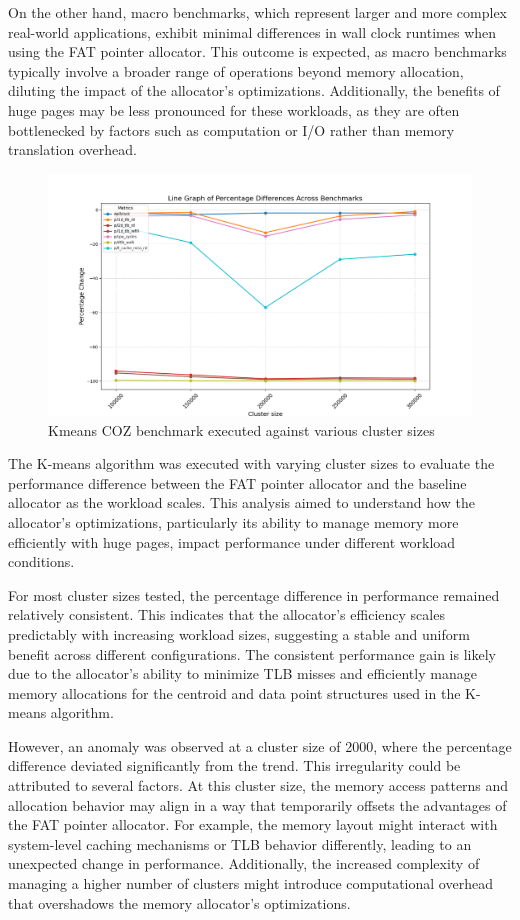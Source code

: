 \documentclass[11pt]{article}
\begin{document}
On the other hand, macro benchmarks, which represent larger and more complex real-world applications, 
exhibit minimal differences in wall clock runtimes when using the FAT pointer allocator. 
This outcome is expected, as macro benchmarks typically involve a broader range of operations 
beyond memory allocation, diluting the impact of the allocator's optimizations. Additionally, 
the benefits of huge pages may be less pronounced for these workloads, as they are often 
bottlenecked by factors such as computation or I/O rather than memory translation overhead.

\begin{figure}[htbp]
\centering
\includegraphics[width=.9\linewidth]{./diagrams/kmeans.png}
\caption{\label{fig:org5dab5a3}Kmeans COZ benchmark executed against various cluster sizes}
\end{figure}

The K-means algorithm was executed with varying cluster sizes to evaluate the performance difference 
between the FAT pointer allocator and the baseline allocator as the workload scales. This analysis 
aimed to understand how the allocator's optimizations, particularly its ability to manage memory 
more efficiently with huge pages, impact performance under different workload conditions.

For most cluster sizes tested, the percentage difference in performance remained relatively 
consistent. This indicates that the allocator's efficiency scales predictably with increasing 
workload sizes, suggesting a stable and uniform benefit across different configurations. The 
consistent performance gain is likely due to the allocator's ability to minimize TLB misses 
and efficiently manage memory allocations for the centroid and data point structures used in 
the K-means algorithm.

However, an anomaly was observed at a cluster size of 2000, where the percentage difference 
deviated significantly from the trend. This irregularity could be attributed to several factors. 
At this cluster size, the memory access patterns and allocation behavior may align in a way that 
temporarily offsets the advantages of the FAT pointer allocator. For example, the memory layout 
might interact with system-level caching mechanisms or TLB behavior differently, leading to an 
unexpected change in performance. Additionally, the increased complexity of managing a higher 
number of clusters might introduce computational overhead that overshadows the memory allocator's 
optimizations.
\end{document}
